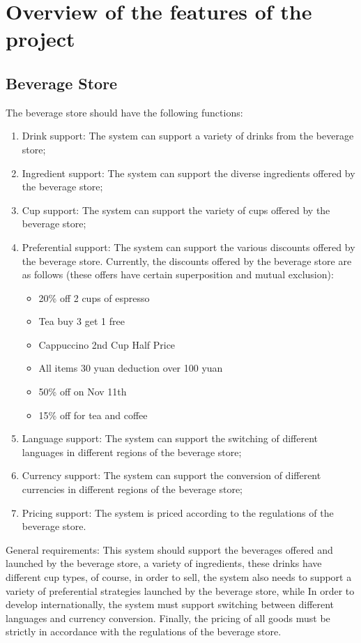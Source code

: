 \documentclass[a4paper]{report}
\begin{document}
\section{Overview of the features of the project}
\subsection{Beverage Store}
The beverage store should have the following functions:
\begin{enumerate}
\item
Drink support: The system can support a variety of drinks from the beverage store;
\item Ingredient support: The system can support the diverse ingredients offered by the beverage store;
\item
Cup support: The system can support the variety of cups offered by the beverage store;
\item 
Preferential support: The system can support the various discounts offered by the beverage store. Currently, the discounts offered by the beverage store are as follows (these offers have certain superposition and mutual exclusion):
\begin{itemize}
\item
20\% off 2 cups of espresso
\item 
Tea buy 3 get 1 free
\item
Cappuccino 2nd Cup Half Price
\item
All items 30 yuan deduction over 100 yuan
\item 50\% off on Nov 11th
\item
15\% off for tea and coffee
\end{itemize}
\item Language support: The system can support the switching of different languages in different regions of the beverage store;
\item
Currency support: The system can support the conversion of different currencies in different regions of the beverage store;
\item
Pricing support: The system is priced according to the regulations of the beverage store.
\end{enumerate}
\par
General requirements: This system should support the beverages offered and launched by the beverage store, a variety of ingredients, these drinks have different cup types, of course, in order to sell, the system also needs to support a variety of preferential strategies launched by the beverage store, while In order to develop internationally, the system must support switching between different languages and currency conversion. Finally, the pricing of all goods must be strictly in accordance with the regulations of the beverage store.
\end{document}
